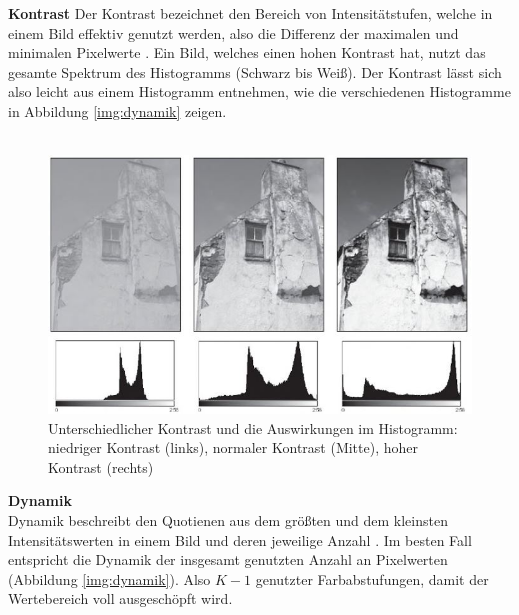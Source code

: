 \textbf{Kontrast}\label{s.kontrast}
Der Kontrast bezeichnet den Bereich von Intensitätstufen, welche in einem Bild effektiv genutzt werden, also die Differenz der maximalen und minimalen Pixelwerte \cite[44]{burger2009digitale}. Ein Bild, welches einen hohen Kontrast hat, nutzt das gesamte Spektrum des Histogramms (Schwarz bis Weiß). Der Kontrast lässt sich also leicht aus einem Histogramm entnehmen, wie die verschiedenen Histogramme in Abbildung \ref{img:dynamik} zeigen.\\\\
  \begin{figure}
    [h]
    \centering
    \includegraphics[scale=0.6]{Sources/kontrast.JPG}
    \caption{Unterschiedlicher Kontrast und die Auswirkungen im Histogramm: niedriger Kontrast (links), normaler Kontrast (Mitte), hoher Kontrast (rechts)\cite[45]{burger2009digitale}}
    \label{img:kontrast}
  \end{figure}
  \newpage
\textbf{Dynamik}\label{s.dynamik}\\
Dynamik beschreibt den Quotienen aus dem größten und dem kleinsten Intensitätswerten in einem Bild und deren jeweilige Anzahl \cite[44]{burger2009digitale}. Im besten Fall entspricht die Dynamik der insgesamt genutzten Anzahl an Pixelwerten (Abbildung \ref{img:dynamik}). Also $K-1$ genutzter Farbabstufungen, damit der Wertebereich voll ausgeschöpft wird.\\
